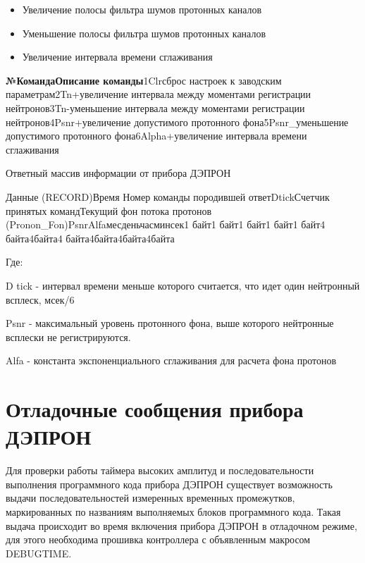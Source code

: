 {\begin{itemize}
	\item Увеличение полосы фильтра шумов протонных каналов

	\item Уменьшение полосы фильтра шумов протонных каналов

	\item Увеличение интервала времени сглаживания

\end{itemize}





\textbf{{\small №КомандаОписание команды}}{\small 1Clr}{\small сброс настроек к заводским параметрам2Tn+увеличение интервала между моментами регистрации нейтронов3Tn-уменьшение интервала между моментами регистрации нейтронов4Psnr+увеличение допустимого протонного фона5Psnr\_уменьшение допустимого протонного фона6Alpha+увеличение интервала времени сглаживания}


Ответный массив информации от прибора ДЭПРОН


{\small Данные (RECORD)Время Номер команды породившей ответD}{\small  }{\small tickСчетчик принятых командТекущий фон потока протонов (}{\small Pronon}{\small \_}{\small Fon}{\small )PsnrAlfaмесденьчасминсек1 байт1 байт1 байт1 байт1 байт4 байта}{\small 4}{\small  байта4 байта}{\small 4}{\small  байта}{\small 4}{\small  байта}{\small 4}{\small  байта}


\begin{flushleft}
	Где:
\end{flushleft}


\begin{flushleft}
	D tick - интервал времени меньше которого считается, что идет один нейтронный всплеск, мсек/6
\end{flushleft}


Psnr - максимальный уровень протонного фона, выше которого нейтронные всплески не регистрируются.


Alfa - константа экспоненциального сглаживания для расчета фона протонов





\section{Отладочные сообщения прибора ДЭПРОН}



Для проверки работы таймера высоких амплитуд и последовательности выполнения программного кода прибора ДЭПРОН существует возможность выдачи последовательностей измеренных временных промежутков, маркированных по названиям выполняемых блоков программного кода. Такая выдача происходит во время включения прибора ДЭПРОН в отладочном режиме, для этого необходима прошивка контроллера с объявленным макросом DEBUGTIME.


}
